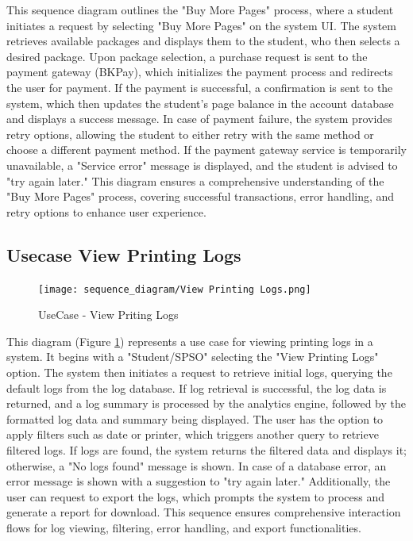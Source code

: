 This sequence diagram outlines the "Buy More Pages" process, where a student initiates a request by selecting "Buy More Pages" on the system UI. The system retrieves available packages and displays them to the student, who then selects a desired package. Upon package selection, a purchase request is sent to the payment gateway (BKPay), which initializes the payment process and redirects the user for payment. If the payment is successful, a confirmation is sent to the system, which then updates the student's page balance in the account database and displays a success message. In case of payment failure, the system provides retry options, allowing the student to either retry with the same method or choose a different payment method. If the payment gateway service is temporarily unavailable, a "Service error" message is displayed, and the student is advised to "try again later." This diagram ensures a comprehensive understanding of the "Buy More Pages" process, covering successful transactions, error handling, and retry options to enhance user experience.

\subsection{Usecase View Printing Logs}

\begin{figure}[H]
    \centering
    \texttt{[image: sequence\_diagram/View Printing Logs.png]}
    \caption{UseCase - View Priting Logs}
    \label{fig:view_printing_logs}
    
\end{figure}

This diagram (Figure \ref{fig:view_printing_logs}) represents a use case for viewing printing logs in a system. It begins with a "Student/SPSO" selecting the "View Printing Logs" option. The system then initiates a request to retrieve initial logs, querying the default logs from the log database. If log retrieval is successful, the log data is returned, and a log summary is processed by the analytics engine, followed by the formatted log data and summary being displayed. The user has the option to apply filters such as date or printer, which triggers another query to retrieve filtered logs. If logs are found, the system returns the filtered data and displays it; otherwise, a "No logs found" message is shown. In case of a database error, an error message is shown with a suggestion to "try again later." Additionally, the user can request to export the logs, which prompts the system to process and generate a report for download. This sequence ensures comprehensive interaction flows for log viewing, filtering, error handling, and export functionalities.

